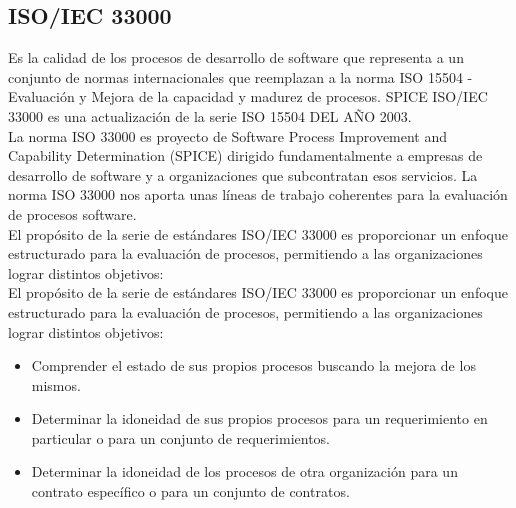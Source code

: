 \documentclass[preprint,12pt]{elsarticle}
\begin{document}
	\subsection{\textbf{ISO/IEC 33000 }}
Es la calidad de los procesos de desarrollo de software que representa a un conjunto de normas internacionales que reemplazan a la norma ISO 15504 - Evaluación y Mejora de la capacidad y madurez de procesos. SPICE ISO/IEC 33000 es una actualización de la serie ISO 15504 DEL AÑO 2003.
\\
La norma ISO 33000 es proyecto de Software Process Improvement and Capability Determination (SPICE) dirigido fundamentalmente a empresas de desarrollo de software y a organizaciones que subcontratan esos servicios. La norma ISO 33000 nos aporta unas líneas de trabajo coherentes para la evaluación de procesos software.
\\
El propósito de la serie de estándares ISO/IEC 33000 es proporcionar un enfoque estructurado para la evaluación de procesos, permitiendo a las organizaciones lograr distintos objetivos:
\\
El propósito de la serie de estándares ISO/IEC 33000 es proporcionar un enfoque estructurado para la evaluación de procesos, permitiendo a las organizaciones lograr distintos objetivos:
\\
	\begin{itemize}
\item Comprender el estado de sus propios procesos buscando la mejora de los mismos.
\item Determinar la idoneidad de sus propios procesos para un requerimiento en particular o para un conjunto de requerimientos.
\item Determinar la idoneidad de los procesos de otra organización para un contrato específico o para un conjunto de contratos.
	\end{itemize}
\end{document}
